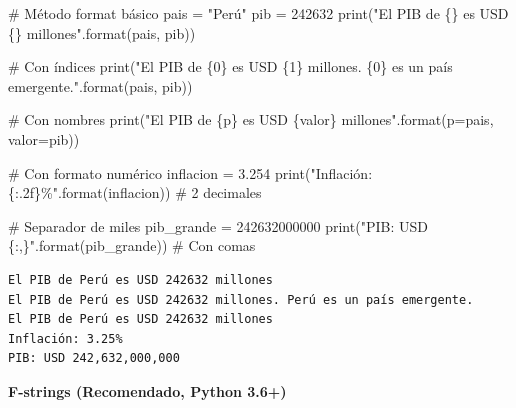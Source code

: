 \documentclass[
  doc,
  floatsintext,
  longtable,
  a4paper,
  nolmodern,
  notxfonts,
  notimes,
  12pt,
  colorlinks=true,linkcolor=blue,citecolor=blue,urlcolor=blue]{apa7}
\newenvironment{Shaded}{\begin{snugshade}}{\end{snugshade}}
\newcommand{\BuiltInTok}[1]{\textcolor[rgb]{0.00,0.23,0.31}{#1}}
\newcommand{\CommentTok}[1]{\textcolor[rgb]{0.37,0.37,0.37}{#1}}
\newcommand{\DecValTok}[1]{\textcolor[rgb]{0.68,0.00,0.00}{#1}}
\newcommand{\FloatTok}[1]{\textcolor[rgb]{0.68,0.00,0.00}{#1}}
\newcommand{\NormalTok}[1]{\textcolor[rgb]{0.00,0.23,0.31}{#1}}
\newcommand{\OperatorTok}[1]{\textcolor[rgb]{0.37,0.37,0.37}{#1}}
\newcommand{\SpecialCharTok}[1]{\textcolor[rgb]{0.37,0.37,0.37}{#1}}
\newcommand{\StringTok}[1]{\textcolor[rgb]{0.13,0.47,0.30}{#1}}
\begin{document}
\begin{Shaded}
\begin{Highlighting}[]
\CommentTok{\# Método format básico}
\NormalTok{pais }\OperatorTok{=} \StringTok{"Perú"}
\NormalTok{pib }\OperatorTok{=} \DecValTok{242632}
\BuiltInTok{print}\NormalTok{(}\StringTok{"El PIB de }\SpecialCharTok{\{\}}\StringTok{ es USD }\SpecialCharTok{\{\}}\StringTok{ millones"}\NormalTok{.}\BuiltInTok{format}\NormalTok{(pais, pib))}

\CommentTok{\# Con índices}
\BuiltInTok{print}\NormalTok{(}\StringTok{"El PIB de }\SpecialCharTok{\{0\}}\StringTok{ es USD }\SpecialCharTok{\{1\}}\StringTok{ millones. }\SpecialCharTok{\{0\}}\StringTok{ es un país emergente."}\NormalTok{.}\BuiltInTok{format}\NormalTok{(pais, pib))}

\CommentTok{\# Con nombres}
\BuiltInTok{print}\NormalTok{(}\StringTok{"El PIB de }\SpecialCharTok{\{p\}}\StringTok{ es USD }\SpecialCharTok{\{valor\}}\StringTok{ millones"}\NormalTok{.}\BuiltInTok{format}\NormalTok{(p}\OperatorTok{=}\NormalTok{pais, valor}\OperatorTok{=}\NormalTok{pib))}

\CommentTok{\# Con formato numérico}
\NormalTok{inflacion }\OperatorTok{=} \FloatTok{3.254}
\BuiltInTok{print}\NormalTok{(}\StringTok{"Inflación: }\SpecialCharTok{\{:.2f\}}\StringTok{\%"}\NormalTok{.}\BuiltInTok{format}\NormalTok{(inflacion))  }\CommentTok{\# 2 decimales}

\CommentTok{\# Separador de miles}
\NormalTok{pib\_grande }\OperatorTok{=} \DecValTok{242632000000}
\BuiltInTok{print}\NormalTok{(}\StringTok{"PIB: USD }\SpecialCharTok{\{:,\}}\StringTok{"}\NormalTok{.}\BuiltInTok{format}\NormalTok{(pib\_grande))  }\CommentTok{\# Con comas}
\end{Highlighting}
\end{Shaded}

\begin{verbatim}
El PIB de Perú es USD 242632 millones
El PIB de Perú es USD 242632 millones. Perú es un país emergente.
El PIB de Perú es USD 242632 millones
Inflación: 3.25%
PIB: USD 242,632,000,000
\end{verbatim}

\textbf{F-strings (Recomendado, Python 3.6+)}
\end{document}
